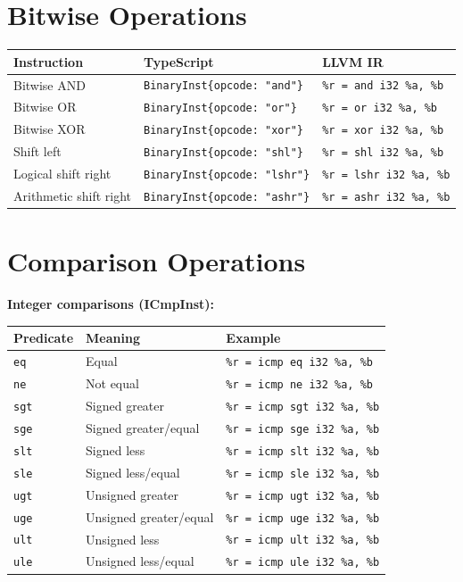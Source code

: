 \documentclass[11pt,oneside]{book}
\begin{document}
\section{Bitwise Operations}

\begin{longtable}{|p{3cm}|p{5cm}|p{5cm}|}
\hline
\textbf{Instruction} & \textbf{TypeScript} & \textbf{LLVM IR} \\
\hline
Bitwise AND & \texttt{BinaryInst\{opcode: "and"\}} & \texttt{\%r = and i32 \%a, \%b} \\
\hline
Bitwise OR & \texttt{BinaryInst\{opcode: "or"\}} & \texttt{\%r = or i32 \%a, \%b} \\
\hline
Bitwise XOR & \texttt{BinaryInst\{opcode: "xor"\}} & \texttt{\%r = xor i32 \%a, \%b} \\
\hline
Shift left & \texttt{BinaryInst\{opcode: "shl"\}} & \texttt{\%r = shl i32 \%a, \%b} \\
\hline
Logical shift right & \texttt{BinaryInst\{opcode: "lshr"\}} & \texttt{\%r = lshr i32 \%a, \%b} \\
\hline
Arithmetic shift right & \texttt{BinaryInst\{opcode: "ashr"\}} & \texttt{\%r = ashr i32 \%a, \%b} \\
\hline
\end{longtable}

\section{Comparison Operations}

\textbf{Integer comparisons (ICmpInst):}
\begin{longtable}{|p{2.5cm}|p{3cm}|p{7cm}|}
\hline
\textbf{Predicate} & \textbf{Meaning} & \textbf{Example} \\
\hline
\texttt{eq} & Equal & \texttt{\%r = icmp eq i32 \%a, \%b} \\
\hline
\texttt{ne} & Not equal & \texttt{\%r = icmp ne i32 \%a, \%b} \\
\hline
\texttt{sgt} & Signed greater & \texttt{\%r = icmp sgt i32 \%a, \%b} \\
\hline
\texttt{sge} & Signed greater/equal & \texttt{\%r = icmp sge i32 \%a, \%b} \\
\hline
\texttt{slt} & Signed less & \texttt{\%r = icmp slt i32 \%a, \%b} \\
\hline
\texttt{sle} & Signed less/equal & \texttt{\%r = icmp sle i32 \%a, \%b} \\
\hline
\texttt{ugt} & Unsigned greater & \texttt{\%r = icmp ugt i32 \%a, \%b} \\
\hline
\texttt{uge} & Unsigned greater/equal & \texttt{\%r = icmp uge i32 \%a, \%b} \\
\hline
\texttt{ult} & Unsigned less & \texttt{\%r = icmp ult i32 \%a, \%b} \\
\hline
\texttt{ule} & Unsigned less/equal & \texttt{\%r = icmp ule i32 \%a, \%b} \\
\hline
\end{longtable}
\end{document}
